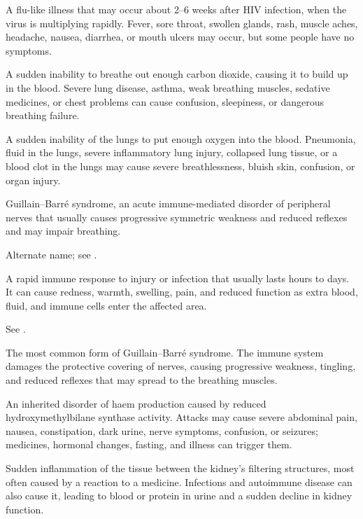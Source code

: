  A flu-like illness that may occur about 2–6 weeks after HIV infection, when the virus is multiplying rapidly. Fever, sore throat, swollen glands, rash, muscle aches, headache, nausea, diarrhea, or mouth ulcers may occur, but some people have no symptoms.

 A sudden inability to breathe out enough carbon dioxide, causing it to build up in the blood. Severe lung disease, asthma, weak breathing muscles, sedative medicines, or chest problems can cause confusion, sleepiness, or dangerous breathing failure.

 A sudden inability of the lungs to put enough oxygen into the blood. Pneumonia, fluid in the lungs, severe inflammatory lung injury, collapsed lung tissue, or a blood clot in the lungs may cause severe breathlessness, bluish skin, confusion, or organ injury.

 Guillain--Barré syndrome, an acute immune-mediated disorder of peripheral nerves that usually causes progressive symmetric weakness and reduced reflexes and may impair breathing.

 Alternate name; see .

 A rapid immune response to injury or infection that usually lasts hours to days. It can cause redness, warmth, swelling, pain, and reduced function as extra blood, fluid, and immune cells enter the affected area.

 See .

 The most common form of Guillain–Barré syndrome. The immune system damages the protective covering of nerves, causing progressive weakness, tingling, and reduced reflexes that may spread to the breathing muscles.

 An inherited disorder of haem production caused by reduced hydroxymethylbilane synthase activity. Attacks may cause severe abdominal pain, nausea, constipation, dark urine, nerve symptoms, confusion, or seizures; medicines, hormonal changes, fasting, and illness can trigger them.

 Sudden inflammation of the tissue between the kidney’s filtering structures, most often caused by a reaction to a medicine. Infections and autoimmune disease can also cause it, leading to blood or protein in urine and a sudden decline in kidney function.

